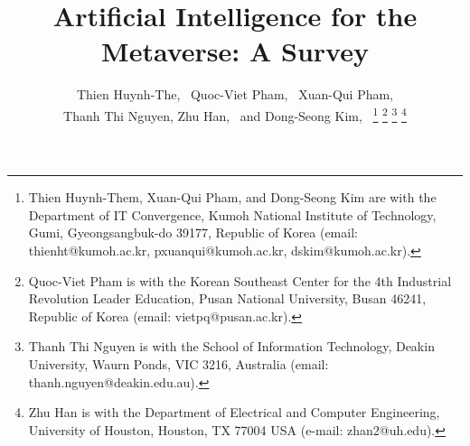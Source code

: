 \documentclass[journal]{IEEEtran}
\begin{document}
\title{Artificial Intelligence for the Metaverse: A Survey}

\author{Thien Huynh-The,~ Quoc-Viet Pham,~ Xuan-Qui Pham,\\ 
Thanh Thi Nguyen, Zhu Han,~ and Dong-Seong Kim,~
\thanks{Thien Huynh-Them, Xuan-Qui Pham, and Dong-Seong Kim are with the Department of IT Convergence, Kumoh National Institute of Technology, Gumi, Gyeongsangbuk-do 39177, Republic of Korea (email: thienht@kumoh.ac.kr, pxuanqui@kumoh.ac.kr, dskim@kumoh.ac.kr).}%
\thanks{Quoc-Viet Pham is with the Korean Southeast Center for the 4th Industrial Revolution Leader Education, Pusan National University, Busan 46241, Republic of Korea (email: vietpq@pusan.ac.kr).}
\thanks{Thanh Thi Nguyen is with the School of Information Technology, Deakin University, Waurn Ponds, VIC 3216, Australia (email: thanh.nguyen@deakin.edu.au).}  
\thanks{Zhu Han is with the Department of Electrical and Computer Engineering, University of Houston, Houston, TX 77004 USA (e-mail: zhan2@uh.edu).}}



\maketitle
\end{document}
